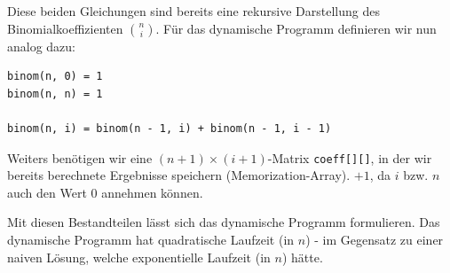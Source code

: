 \documentclass{article}
\begin{document}
Diese beiden Gleichungen sind bereits eine rekursive Darstellung des
Binomialkoeffizienten $\binom{n}{i}$. F{\"u}r das dynamische Programm definieren 
wir nun analog dazu:

\begin{verbatim}
binom(n, 0) = 1
binom(n, n) = 1

binom(n, i) = binom(n - 1, i) + binom(n - 1, i - 1)
\end{verbatim}

Weiters ben{\"o}tigen wir eine $(n + 1)\times (i + 1)$-Matrix \texttt{coeff[][]},
in der wir bereits berechnete Ergebnisse speichern (Memorization-Array). $+ 1$,
da $i$ bzw. $n$ auch den Wert $0$ annehmen k{\"o}nnen.

Mit diesen Bestandteilen l{\"a}sst sich das dynamische Programm formulieren. Das
dynamische Programm hat quadratische Laufzeit (in $n$) - im Gegensatz zu einer
naiven L{\"o}sung, welche exponentielle Laufzeit (in $n$) h{\"a}tte.

\begin{minipage}{.315\textwidth}
\begin{algorithm}[H]
    \small
%
%
\end{algorithm}
\end{minipage}
\begin{minipage}{.635\textwidth}
\begin{algorithm}[H]
    \small
%
\end{algorithm}
\end{minipage}
\end{document}
